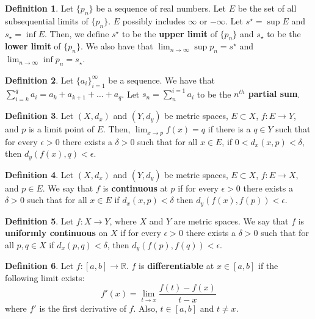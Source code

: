 \documentclass[12pt]{article}
\theoremstyle{definition}
\newtheorem{definition}{Definition}
\theoremstyle{named}
\begin{document}
\renewcommand{\thedefinition}{3.16}
\begin{definition}
    Let $\{p_n\}$ be a sequence of real numbers. Let $E$ be the set of all subsequential limits of $\{p_n\}$. $E$ possibly includes $\infty$ or $-\infty$. Let $s^\star = \sup E$ and $s_\star = \inf E$. Then, we define $s^\star$ to be the \textbf{upper limit} of $\{p_n\}$ and $s_\star$ to be the \textbf{lower limit} of $\{p_n\}$. We also have that $\lim_{n \to \infty} \sup p_n = s^\star$ and $\lim_{n \to \infty} \inf p_n = s_\star$. 
\end{definition}

\renewcommand{\thedefinition}{3.21}
\begin{definition}
    Let $\{a_i\}_{i=1}^{\infty}$ be a sequence. We have that $\sum_{i=k}^{q} a_i = a_k + a_{k+1} + \dots + a_q$. Let $s_n = \sum_{n}^{i=1} a_i$ to be the \textbf{$n^{th}$ partial sum}. 
\end{definition}

\renewcommand{\thedefinition}{4.1}
\begin{definition}
    Let $(X,d_x)$ and $(Y,d_y)$ be metric spaces, $E \subset X$, $f: E \to Y$, and $p$ is a limit point of $E$. Then, $\lim_{x \to p} f(x) = q$ if there is a $q \in Y$ such that for every $\epsilon > 0$ there exists a $\delta > 0$ such that for all $x \in E$, if $0 < d_x(x,p) < \delta$, then $d_y(f(x), q) < \epsilon$. 
\end{definition}

\renewcommand{\thedefinition}{4.5}
\begin{definition}
    Let $(X,d_x)$ and $(Y,d_y)$ be metric spaces, $E \subset X$, $f: E \to X$, and $p \in E$. We say that $f$ is \textbf{continuous} at $p$ if for every $\epsilon > 0$ there exists a $\delta > 0$ such that for all $x \in E$ if $d_x(x,p) < \delta$ then $d_y(f(x), f(p)) < \epsilon$. 
\end{definition}

\renewcommand{\thedefinition}{4.18}
\begin{definition}
    Let $f: X \to Y$, where $X$ and $Y$ are metric spaces. We say that $f$ is \textbf{uniformly continuous} on $X$ if for every $\epsilon > 0$ there exists a $\delta > 0$ such that for all $p,q \in X$ if $d_x(p,q) < \delta$, then $d_y(f(p), f(q)) < \epsilon$. 
\end{definition}

\renewcommand{\thedefinition}{5.1}
\begin{definition}
    Let $f: [a,b] \to \mathbb{R}$. $f$ is \textbf{differentiable} at $x \in [a,b]$ if the following limit exists: 
    $$
    f'(x) = \lim_{t \to x} \frac{f(t) - f(x)}{t-x}
    $$
    where $f'$ is the first derivative of $f$. Also, $t \in [a,b]$ and $t \neq x$. 
\end{definition}
\end{document}
